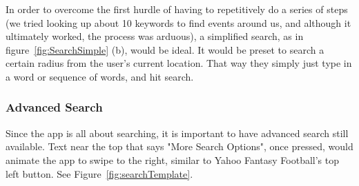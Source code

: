 \documentclass[11pt]{article}
\begin{document}
In order to overcome the first hurdle of having to repetitively do a series of steps (we tried looking up about 10 keywords to find events around us, and although it ultimately worked, the process was arduous), a simplified search, as in figure~\ref{fig:SearchSimple} (b), would be ideal. It would be preset to search a certain radius from the user's current location. That way they simply just type in a word or sequence of words, and hit search. 

\subsubsection{Advanced Search}
Since the app is all about searching, it is important to have advanced search still available. Text near the top that says "More Search Options", once pressed, would animate the app to swipe to the right, similar to Yahoo Fantasy Football's top left button. See Figure~\ref{fig:searchTemplate}.
\end{document}
